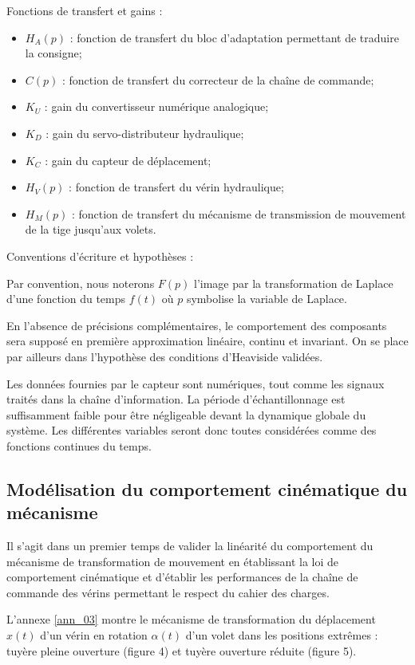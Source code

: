 \documentclass[10pt,fleqn]{article} %
\begin{document}
\noindent Fonctions de transfert et gains :
\begin{itemize}
\item $H_A(p)$	: 	fonction de transfert du bloc d'adaptation permettant de traduire la consigne;
\item $C(p)$	: 	fonction de transfert du correcteur de la chaîne de commande;
\item $K_U$	: 	gain du convertisseur numérique analogique;
\item $K_D$	:	gain du servo-distributeur hydraulique;
\item $K_C$	:	gain du capteur de déplacement;
\item $H_V(p)$	:	fonction de transfert du vérin hydraulique;
\item $H_M(p)$	:	fonction de transfert du mécanisme de transmission de mouvement de la tige jusqu'aux volets.
\end{itemize}

Conventions d'écriture et hypothèses :

	Par convention, nous noterons $F(p)$ l'image par la transformation de Laplace d'une fonction du temps $f(t)$ où $p$ symbolise la variable de Laplace.

	En l'absence de précisions complémentaires, le comportement des composants sera supposé en première approximation linéaire, continu et invariant. On se place par ailleurs dans l'hypothèse des conditions d'Heaviside validées.

Les données fournies par le capteur sont numériques, tout comme les signaux traités dans la chaîne d'information. La période d'échantillonnage est suffisamment faible pour être négligeable devant la dynamique globale du système. Les différentes variables seront donc toutes considérées comme des fonctions continues du temps. 


\subsection{Modélisation du comportement cinématique du mécanisme\label{sec_B1}}

\begin{obj}
Il s'agit dans un premier temps de valider la linéarité du comportement du mécanisme de transformation de mouvement en établissant la loi de comportement cinématique et d'établir les performances de la chaîne de commande des vérins permettant le respect du cahier des charges.
\end{obj}

	L'annexe \ref{ann_03} montre le mécanisme de transformation du déplacement $x(t)$ d'un vérin en rotation $\alpha(t)$ d'un volet dans les positions extrêmes : tuyère pleine ouverture (figure 4) et tuyère ouverture réduite (figure 5).
	
\end{document}
